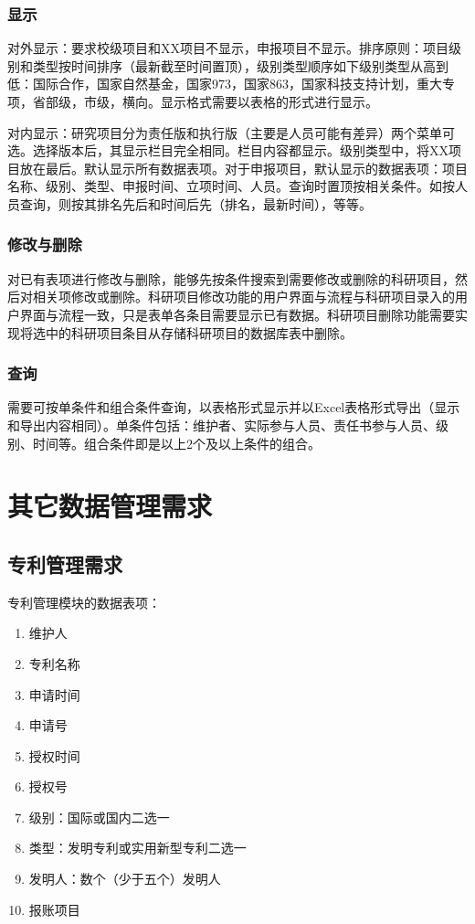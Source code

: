 \subsubsection{显示}
\label{projectview}
对外显示：要求校级项目和XX项目不显示，申报项目不显示。排序原则：项目级别和类型按时间排序（最新截至时间置顶），级别类型顺序如下级别类型从高到低：国际合作，国家自然基金，国家973，国家863，国家科技支持计划，重大专项，省部级，市级，横向。显示格式需要以表格的形式进行显示。

对内显示：研究项目分为责任版和执行版（主要是人员可能有差异）两个菜单可选。选择版本后，其显示栏目完全相同。栏目内容都显示。级别类型中，将XX项目放在最后。默认显示所有数据表项。对于申报项目，默认显示的数据表项：项目名称、级别、类型、申报时间、立项时间、人员。查询时置顶按相关条件。如按人员查询，则按其排名先后和时间后先（排名，最新时间），等等。

\subsubsection{修改与删除}
\label{projectupdate}
对已有表项进行修改与删除，能够先按条件搜索到需要修改或删除的科研项目，然后对相关项修改或删除。科研项目修改功能的用户界面与流程与科研项目录入的用户界面与流程一致，只是表单各条目需要显示已有数据。科研项目删除功能需要实现将选中的科研项目条目从存储科研项目的数据库表中删除。

\subsubsection{查询}
\label{projectsearch}
需要可按单条件和组合条件查询，以表格形式显示并以Excel表格形式导出（显示和导出内容相同）。单条件包括：维护者、实际参与人员、责任书参与人员、级别、时间等。组合条件即是以上2个及以上条件的组合。

\section{其它数据管理需求}
\subsection{专利管理需求}

专利管理模块的数据表项：

\begin{enumerate}
\item 维护人
\item 专利名称
\item 申请时间
\item 申请号
\item 授权时间
\item 授权号
\item 级别：国际或国内二选一
\item 类型：发明专利或实用新型专利二选一
\item 发明人：数个（少于五个）发明人
\item 报账项目
\end{enumerate}

